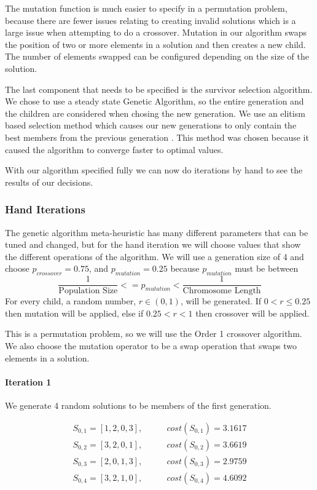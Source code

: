 \documentclass[a4paper]{article}
\newcommand{\subsubsubsection}[1]{\paragraph{#1} \mbox{}}
\begin{document}
The mutation function is much easier to specify in a permutation problem, because there are fewer issues relating to creating invalid solutions which is a large issue when attempting to do a crossover. Mutation in our algorithm swaps the position of two or more elements in a solution and then creates a new child. The number of elements swapped can be configured depending on the size of the solution.

The last component that needs to be specified is the survivor selection algorithm. We chose to use a steady state Genetic Algorithm, so the entire generation and the children are considered when chosing the new generation. We use an elitism based selection method which causes our new generations to only contain the best members from the previous generation \cite{Talk}. This method was chosen because it caused the algorithm to converge faster to optimal values.

With our algorithm specified fully we can now do iterations by hand to see the results of our decisions.

\subsubsection{Hand Iterations}

The genetic algorithm meta-heuristic has many different parameters that can be tuned and changed, but for the hand iteration we will choose values that show the different operations of the algorithm. We will use a generation size of 4 and choose $p_\mathit{crossover}=0.75$, and $p_\mathit{mutation}=0.25$ because $p_\mathit{mutation}$ must be between $$\frac{1}{\text{Population Size}} <= p_\mathit{mutation} < \frac{1}{\text{Chromosome Length}}$$ For every child, a random number, $r \in (0,1)$, will be generated. If $0<r\leq0.25$ then mutation will be applied, else if $0.25<r<1$ then crossover will be applied.

This is a permutation problem, so we will use the Order 1 crossover algorithm. We also choose the mutation operator to be a swap operation that swaps two elements in a solution.

\subsubsubsection{Iteration 1}

We generate 4 random solutions to be members of the first generation.

\begin{align*}
S_{0,1} = [1, 2, 0, 3], & \qquad cost(S_{0,1}) = 3.1617 \\
S_{0,2} = [3, 2, 0, 1], & \qquad cost(S_{0,2}) = 3.6619 \\
S_{0,3} = [2, 0, 1, 3], & \qquad cost(S_{0,3}) = 2.9759 \\
S_{0,4} = [3, 2, 1, 0], & \qquad cost(S_{0,4}) = 4.6092
\end{align*}
\end{document}
